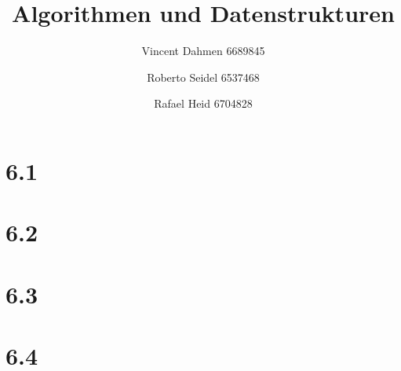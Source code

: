 \documentclass[12pt,a4paper]{article}
\title{Algorithmen und Datenstrukturen}
\author{Vincent Dahmen 6689845 \and Roberto Seidel 6537468 \and Rafael Heid 6704828}
\begin{document}
\maketitle{}


\section*{6.1}


\section*{6.2}


\section*{6.3}

\newpage
\section*{6.4}

\end{document}
